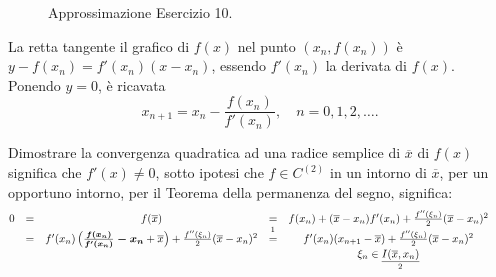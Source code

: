 
\begin{figure}[ht]
	\centering
	\caption{Approssimazione Esercizio 10.}\label{fig:approxNewtEs10}
\end{figure}

\noindent La retta tangente il grafico di $f(x)$ nel punto $(x_n, f(x_n))$ è $y-f(x_n)=f'(x_n)(x-x_n)$, essendo $f'(x_n)$ la derivata di $f(x).$ Ponendo $y=0$, è ricavata
\begin{equation*}
	x_{n+1}=x_n-\frac{f(x_n)}{f'(x_n)},\quad n=0,1,2,\hdots.
\end{equation*}

\noindent Dimostrare la convergenza quadratica ad una radice semplice di $ \overline{x}$ di $f(x)$ significa che $f'(x)\neq 0$, sotto ipotesi che $f\in C^{(2)}$ in un intorno di $\overline{x}$, per un opportuno intorno, per il Teorema della permanenza del segno, significa:
\begin{equation*}
	\begin{matrix}
		0&=&f(\overline{x})&=& f(x_n)+(\overline{x}-x_n)f'(x_n)+\frac{f''(\xi_n)}{2}(\overline{x}-x_n)^2&&\\
		&=&f'(x_n)\left(\boldsymbol{\frac{f(x_n)}{f'(x_n)}-x_n}+\overline{x}\right) + \frac{f''(\xi_n)}{2}(\overline{x}-x_n)^2&\overset{\footnotemark}{=}& f'(x_n)(x_{n+1}-\overline{x})+\frac{f''(\xi_n)}{2}(\overline{x}-x_n)^2\\
		&&&&\xi_n\in\underset{\footnotemark}{\uline{I(\overline{x}, x_n)}}
	\end{matrix}
\end{equation*}

